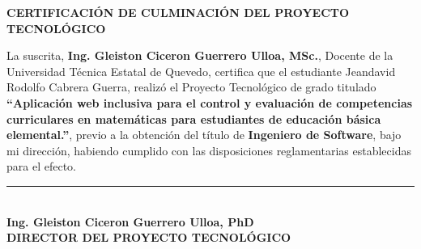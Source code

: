 \begin{center}
    \vspace*{0.5cm}
    {\bfseries CERTIFICACIÓN DE CULMINACIÓN DEL PROYECTO TECNOLÓGICO}
\end{center}
\vspace{1cm}

\justifying
La suscrita, \textbf{Ing. Gleiston Ciceron Guerrero Ulloa, MSc.}, Docente de la Universidad Técnica Estatal de Quevedo, certifica que el estudiante Jeandavid Rodolfo Cabrera Guerra, realizó el Proyecto Tecnológico de grado titulado \textbf{``Aplicación web inclusiva para el control y evaluación de competencias curriculares en matemáticas para estudiantes de educación básica elemental.''}, previo a la obtención del título de \textbf{Ingeniero de Software}, bajo mi dirección, habiendo cumplido con las disposiciones reglamentarias establecidas para el efecto.

\vspace{4cm}

\begin{center}
    \rule{8cm}{0.4pt}\\[0.2cm]
    \textbf{Ing. Gleiston Ciceron Guerrero Ulloa, PhD}\\
    \textbf{DIRECTOR DEL PROYECTO TECNOLÓGICO}
\end{center}

\newpage
